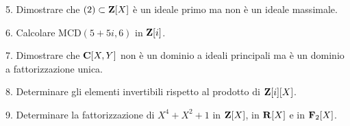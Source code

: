 \item{5.} Dimostrare che $(2)\subset{\bf Z}[X]$ \`e un ideale primo
ma non \`e un ideale massimale.\ve\vs

\item{6.} Calcolare MCD$(5+5i,6)$ in ${\bf Z}[i]$.
\vv

\item{7.} Dimostrare che ${\bf C}[X,Y]$ non \`e un dominio a ideali principali ma \`e un
dominio a fattorizzazione unica.
\ve \vs

\item{8.} Determinare gli elementi invertibili rispetto al prodotto di ${\bf Z}[i][X]$.
\vv\vv

\item{9.} Determinare la fattorizzazione di $X^4+X^2+1$ in ${\bf Z}[X]$, in ${\bf R}[X]$ e in ${\bf F}_2[X]$.
\ \vst

 \bye
